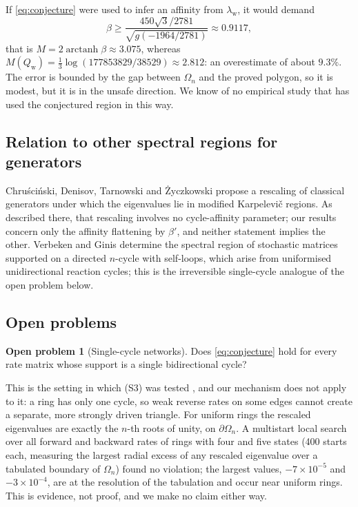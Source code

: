 \documentclass[11pt,a4paper]{article}
\numberwithin{equation}{section}
\theoremstyle{definition}
\newtheorem{problem}[theorem]{Open problem}
\theoremstyle{remark}
\newcommand{\Om}{\Omega}
\newcommand{\Qw}{Q_{\mathrm{w}}}
\newcommand{\lw}{\lambda_{\mathrm{w}}}
\begin{document}
If \eqref{eq:conjecture} were used to infer an affinity from
\(\lw\), it would demand
\[
\beta\geq\frac{450\sqrt3/2781}{\sqrt{g(-1964/2781)}}\approx0.9117,
\]
that is \(M=2\operatorname{arctanh}\beta\approx3.075\), whereas
\(M(\Qw)=\frac13\log(177853829/38529)\approx2.812\): an overestimate of
about \(9.3\%\). The error is bounded by the gap between \(\Om_n\) and
the proved polygon, so it is modest, but it is in the unsafe direction.
We know of no empirical study that has used the conjectured region in
this way.

\subsection{Relation to other spectral regions for generators}

Chru\'sci\'nski, Denisov, Tarnowski and \.Zyczkowski
\cite{chruscinski2025} propose a rescaling of classical generators under
which the eigenvalues lie in modified Karpelevi\v{c} regions. As
described there, that rescaling involves no cycle-affinity parameter;
our results concern only the affinity flattening by \(\beta'\), and
neither statement implies the other. Verbeken and Ginis
\cite{verbeken2026} determine the spectral region of stochastic
matrices supported on a directed \(n\)-cycle with self-loops, which
arise from uniformised unidirectional reaction cycles; this is the
irreversible single-cycle analogue of the open problem below.

\subsection{Open problems}

\begin{problem}[Single-cycle networks]
\label{prob:unicyclic}
Does \eqref{eq:conjecture} hold for every rate matrix whose support is a
single bidirectional cycle?
\end{problem}

This is the setting in which (S3) was tested \cite{xu2025}, and our
mechanism does not apply to it: a ring has only one cycle, so weak
reverse rates on some edges cannot create a separate, more strongly
driven triangle. For uniform rings the rescaled eigenvalues are exactly
the \(n\)-th roots of unity, on \(\partial\Om_n\). A multistart local
search over all forward and backward rates of rings with four and five
states (400 starts each, measuring the largest radial excess of any
rescaled eigenvalue over a tabulated boundary of \(\Om_n\)) found no
violation; the largest values, \(-7\times10^{-5}\) and
\(-3\times10^{-4}\), are at the resolution of the tabulation and occur
near uniform rings. This is evidence, not proof, and we make no claim
either way.
\end{document}
